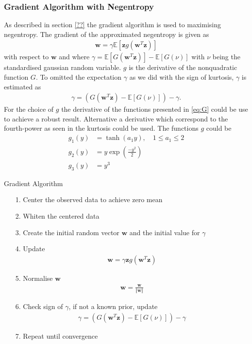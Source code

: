 \subsubsection*{Gradient Algorithm with Negentropy}
As described in section \ref{??} the gradient algorithm is used to maximising negentropy. The gradient of the approximated negentropy is given as
\begin{align*}
\mathbf{w} = \gamma \mathbb{E}[\mathbf{z} g(\mathbf{w}^T \mathbf{z})]
\end{align*}
with respect to $\mathbf{w}$ and where $\gamma = \mathbb{E}[G(\mathbf{w}^T \mathbf{z})] - \mathbb{E}[G(\nu)]$ with $\nu$ being the standardised gaussian random variable. $g$ is the derivative of the nonquadratic function $G$. To omitted the expectation $\gamma$ as we did with the sign of kurtosis, $\gamma$ is estimated as
\begin{align*}
\gamma = (G(\mathbf{w}^T \mathbf{z}) - \mathbb{E}[G(\nu)]) - \gamma.
\end{align*}
For the choice of $g$ the derivative of the functions presented in \eqref{eq:G} could be use to achieve a robust result. Alternative a derivative which correspond to the fourth-power as seen in the kurtosis could be used. The functions $g$ could be
\begin{align*}
g_1 (y) &= \tanh (a_1 y), \quad 1 \leq a_1 \leq 2  \\
g_2 (y) &= y \exp\left( \frac{-y^2}{2} \right) \\
g_3 (y) &= y^3
\end{align*}

\begin{algorithm}[H]
\caption{Gradient Algorithm}
\begin{itemize}
\item[1.] Center the observed data to achieve zero mean
\item[2.] Whiten the centered data
\item[3.] Create the initial random vector $\mathbf{w}$ and the initial value for $\gamma$
\item[4.] Update
\begin{align*}
\mathbf{w} = \gamma \mathbf{z} g(\mathbf{w}^T \mathbf{z})
\end{align*}
\item[5.] Normalise $\mathbf{w}$
\begin{align*}
\mathbf{w} = \frac{\mathbf{w}}{\Vert \mathbf{w} \Vert}
\end{align*}
\item[6.] Check sign of $\gamma$, if not a known prior, update
\begin{align*}
\gamma = (G(\mathbf{w}^T \mathbf{z}) - \mathbb{E}[G(\nu)]) - \gamma
\end{align*}
\item[7.] Repeat until convergence
\end{itemize}
\end{algorithm}

